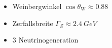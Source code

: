 
\begin{iframe}
\begin{itemize}
	\item	Weinbergwinkel $\cos{\theta_\text{W}} \approx 0.88$
	\item Zerfallsbreite $\Gamma_Z \approx \SI{2.4}{GeV}$
	\item 3 Neutrinogeneration
\end{itemize}
\end{iframe}
